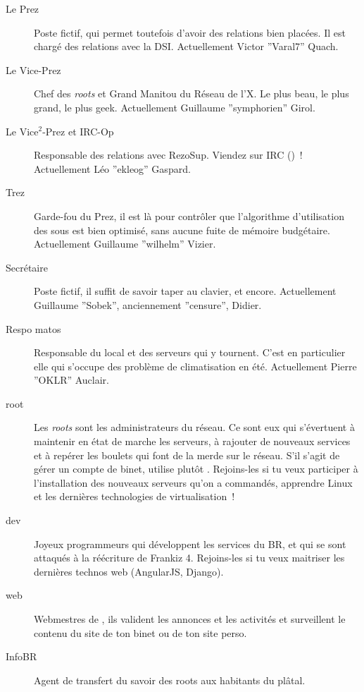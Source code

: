 \begin{description}
  \item[Le Prez]{Poste fictif, qui permet toutefois d'avoir des relations bien placées. Il est chargé des relations avec la DSI. Actuellement Victor ''Varal7'' Quach.}

  \item[Le Vice-Prez]{Chef des \emph{roots} et Grand Manitou du Réseau de l'X. Le plus beau, le plus grand, le plus geek. Actuellement Guillaume ''symphorien'' Girol.}

  \item[Le Vice$^2$-Prez et IRC-Op]{Responsable des relations avec RezoSup. Viendez sur IRC ()~! \linebreak Actuellement Léo ''ekleog'' Gaspard.}

  \item[Trez]{Garde-fou du Prez, il est là pour contrôler que l'algorithme d'utilisation des sous est bien optimisé, sans aucune fuite de mémoire budgétaire. Actuellement Guillaume ''wilhelm'' Vizier.}

  \item[Secrétaire]{Poste fictif, il suffit de savoir taper au clavier, et encore. Actuellement Guillaume ''Sobek'', anciennement ''censure'', Didier.}

  \item[Respo matos]{Responsable du local et des serveurs qui y tournent. C'est en particulier elle qui s'occupe des problème de climatisation en été. Actuellement Pierre ''OKLR'' Auclair.}

  \item[root]{Les \emph{roots} sont les administrateurs du réseau. Ce sont eux qui s'évertuent à maintenir en état de marche les serveurs, à rajouter de
  nouveaux services et à repérer les boulets qui font de la merde sur le réseau. S'il s'agit de gérer un compte de binet, utilise plutôt . Rejoins-les si tu veux participer à l'installation des nouveaux serveurs qu'on a commandés, apprendre Linux et les dernières technologies de virtualisation~!}

  \item[dev]{Joyeux programmeurs qui développent les services du BR, et qui se sont attaqués à la réécriture de Frankiz 4. Rejoins-les si tu veux maitriser les dernières technos web (AngularJS, Django).}

  \item[web]{Webmestres de \fkz, ils valident les annonces et les activités et surveillent le contenu du site de ton binet ou de ton site perso.}

  \item[InfoBR]{Agent de transfert du savoir des roots aux habitants du plâtal.}
\end{description}

